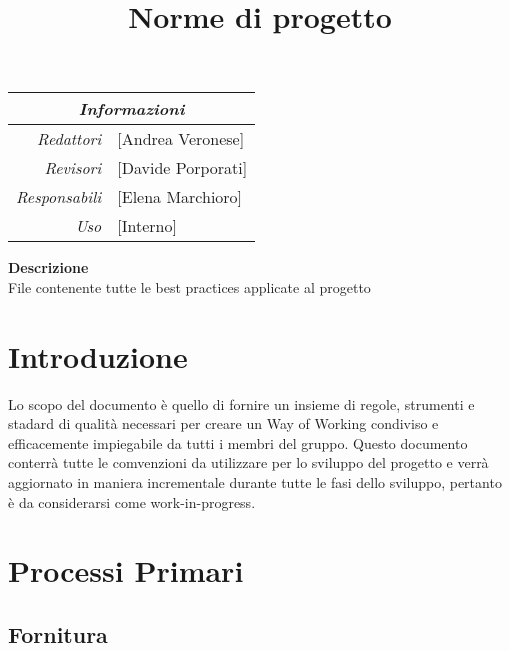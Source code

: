 \documentclass[12pt]{article}
\begin{document}
\graphicspath{ {../templates/img/} }


\title{Norme di progetto}

\firstPage

\maketitle

\begin{center}
    \begin{tabular}{r | l}
		\multicolumn{2}{c}{\textit{Informazioni}}\\
		\hline
		
			\textit{Redattori} &
			[Andrea Veronese]\makecell{}\\

			\textit{Revisori} &
			[Davide Porporati]\makecell{}\\
			\textit{Responsabili} &
			[Elena Marchioro]\makecell{}\\
		      \textit{Uso} & 
                [Interno]\makecell{}\\
    \end{tabular}
\end{center}

\begin{center}
    \textbf{Descrizione}\\
    File contenente tutte le best practices applicate al progetto 
\end{center}

\pagebreak

\tableofcontents
\pagebreak

\printindex 
\section{Introduzione}
Lo scopo del documento è quello di fornire un insieme di regole, strumenti e stadard di qualità necessari per creare un Way of Working condiviso e efficacemente impiegabile da tutti i membri del gruppo.
Questo documento conterrà tutte le comvenzioni da utilizzare per lo sviluppo del progetto e verrà aggiornato in maniera incrementale durante tutte le fasi dello sviluppo, pertanto è da considerarsi come work-in-progress.


\section{Processi Primari}
\subsection{Fornitura}
\end{document}
